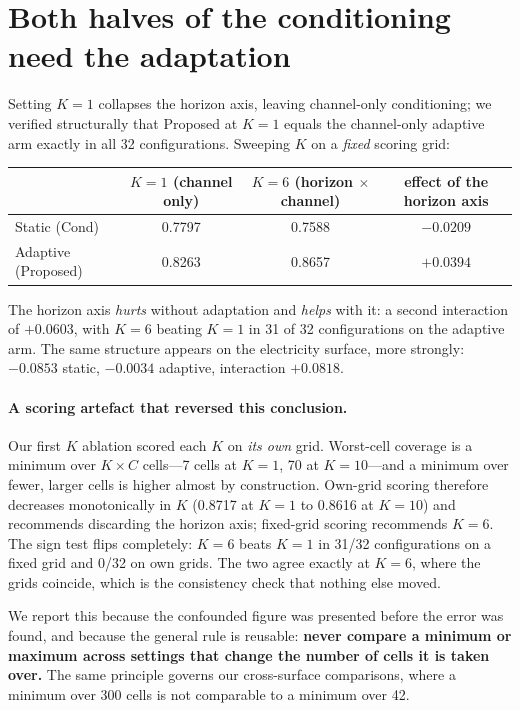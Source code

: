 \documentclass[11pt]{article}
\begin{document}
\section{Both halves of the conditioning need the adaptation}\label{sec:frailty}

Setting $K=1$ collapses the horizon axis, leaving channel-only conditioning; we verified structurally that Proposed at $K=1$ equals the channel-only adaptive arm exactly in all 32 configurations. Sweeping $K$ on a \emph{fixed} scoring grid:

\begin{center}\small
\begin{tabular}{lcc c}
\toprule
& $K=1$ (channel only) & $K=6$ (horizon $\times$ channel) & effect of the horizon axis\\
\midrule
Static (Cond) & 0.7797 & 0.7588 & $-0.0209$\\
Adaptive (Proposed) & 0.8263 & 0.8657 & $+0.0394$\\
\bottomrule
\end{tabular}
\end{center}

The horizon axis \emph{hurts} without adaptation and \emph{helps} with it: a second interaction of $+0.0603$, with $K=6$ beating $K=1$ in 31 of 32 configurations on the adaptive arm. The same structure appears on the electricity surface, more strongly: $-0.0853$ static, $-0.0034$ adaptive, interaction $+0.0818$.

\paragraph{A scoring artefact that reversed this conclusion.} Our first $K$ ablation scored each $K$ on \emph{its own} grid. Worst-cell coverage is a minimum over $K \times C$ cells---7 cells at $K=1$, 70 at $K=10$---and a minimum over fewer, larger cells is higher almost by construction. Own-grid scoring therefore decreases monotonically in $K$ (0.8717 at $K{=}1$ to 0.8616 at $K{=}10$) and recommends discarding the horizon axis; fixed-grid scoring recommends $K=6$. The sign test flips completely: $K=6$ beats $K=1$ in 31/32 configurations on a fixed grid and 0/32 on own grids. The two agree exactly at $K=6$, where the grids coincide, which is the consistency check that nothing else moved.

We report this because the confounded figure was presented before the error was found, and because the general rule is reusable: \textbf{never compare a minimum or maximum across settings that change the number of cells it is taken over.} The same principle governs our cross-surface comparisons, where a minimum over 300 cells is not comparable to a minimum over 42.
\end{document}
